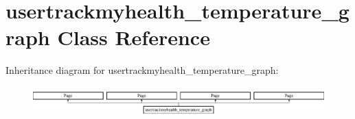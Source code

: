 \hypertarget{classusertrackmyhealth__temperature__graph}{\section{usertrackmyhealth\-\_\-temperature\-\_\-graph Class Reference}
\label{classusertrackmyhealth__temperature__graph}
}
Inheritance diagram for usertrackmyhealth\-\_\-temperature\-\_\-graph\-:\begin{figure}[H]
\begin{center}
\leavevmode
\includegraphics[height=1.181435cm]{classusertrackmyhealth__temperature__graph}
\end{center}
\end{figure}
